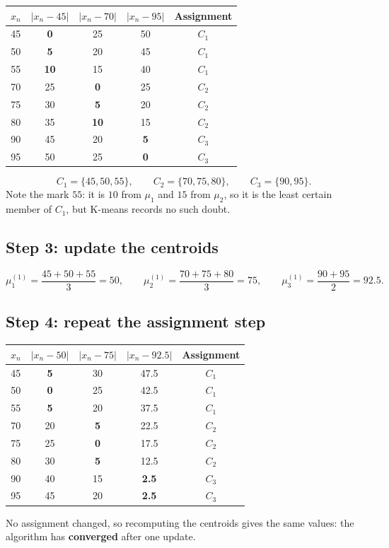 \documentclass[11pt,a4paper]{article}
\begin{document}
\begin{center}
\begin{tabular}{@{}ccccc@{}}
\toprule
$x_n$ & $|x_n-45|$ & $|x_n-70|$ & $|x_n-95|$ & Assignment\\
\midrule
45 & \textbf{0} & 25 & 50 & $C_1$\\
50 & \textbf{5} & 20 & 45 & $C_1$\\
55 & \textbf{10} & 15 & 40 & $C_1$\\
70 & 25 & \textbf{0} & 25 & $C_2$\\
75 & 30 & \textbf{5} & 20 & $C_2$\\
80 & 35 & \textbf{10} & 15 & $C_2$\\
90 & 45 & 20 & \textbf{5} & $C_3$\\
95 & 50 & 25 & \textbf{0} & $C_3$\\
\bottomrule
\end{tabular}
\end{center}
\[
C_1=\{45,50,55\},\qquad C_2=\{70,75,80\},\qquad C_3=\{90,95\}.
\]
Note the mark $55$: it is $10$ from $\mu_1$ and $15$ from $\mu_2$, so it is the least certain member of $C_1$, but K-means records no such doubt.

\subsection{Step 3: update the centroids}
\[
\mu_1^{(1)}=\frac{45+50+55}{3}=50,\qquad
\mu_2^{(1)}=\frac{70+75+80}{3}=75,\qquad
\mu_3^{(1)}=\frac{90+95}{2}=92.5.
\]

\subsection{Step 4: repeat the assignment step}

\begin{center}
\begin{tabular}{@{}ccccc@{}}
\toprule
$x_n$ & $|x_n-50|$ & $|x_n-75|$ & $|x_n-92.5|$ & Assignment\\
\midrule
45 & \textbf{5} & 30 & 47.5 & $C_1$\\
50 & \textbf{0} & 25 & 42.5 & $C_1$\\
55 & \textbf{5} & 20 & 37.5 & $C_1$\\
70 & 20 & \textbf{5} & 22.5 & $C_2$\\
75 & 25 & \textbf{0} & 17.5 & $C_2$\\
80 & 30 & \textbf{5} & 12.5 & $C_2$\\
90 & 40 & 15 & \textbf{2.5} & $C_3$\\
95 & 45 & 20 & \textbf{2.5} & $C_3$\\
\bottomrule
\end{tabular}
\end{center}
No assignment changed, so recomputing the centroids gives the same values: the algorithm has \textbf{converged} after one update.
\end{document}
